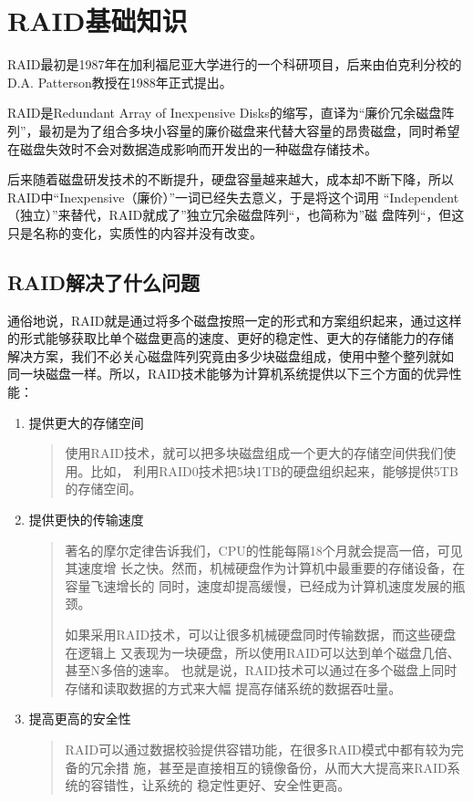 \section{RAID基础知识}

RAID最初是1987年在加利福尼亚大学进行的一个科研项目，后来由伯克利分校的
D.A. Patterson教授在1988年正式提出。

RAID是Redundant Array of Inexpensive Disks的缩写，直译为“廉价冗余磁盘阵
列”，最初是为了组合多块小容量的廉价磁盘来代替大容量的昂贵磁盘，同时希望
在磁盘失效时不会对数据造成影响而开发出的一种磁盘存储技术。

后来随着磁盘研发技术的不断提升，硬盘容量越来越大，成本却不断下降，所以
RAID中“Inexpensive（廉价）”一词已经失去意义，于是将这个词用
“Independent（独立）”来替代，RAID就成了”独立冗余磁盘阵列“，也简称为”磁
盘阵列“，但这只是名称的变化，实质性的内容并没有改变。

\subsection{RAID解决了什么问题}

通俗地说，RAID就是通过将多个磁盘按照一定的形式和方案组织起来，通过这样
的形式能够获取比单个磁盘更高的速度、更好的稳定性、更大的存储能力的存储
解决方案，我们不必关心磁盘阵列究竟由多少块磁盘组成，使用中整个整列就如
同一块磁盘一样。所以，RAID技术能够为计算机系统提供以下三个方面的优异性
能：

\begin{enumerate}[itemsep=0pt,parsep=0pt]
\item 提供更大的存储空间
\begin{quote}
  使用RAID技术，就可以把多块磁盘组成一个更大的存储空间供我们使用。比如，
  利用RAID0技术把5块1TB的硬盘组织起来，能够提供5TB的存储空间。
\end{quote}

\item 提供更快的传输速度
\begin{quote}
  著名的摩尔定律告诉我们，CPU的性能每隔18个月就会提高一倍，可见其速度增
  长之快。然而，机械硬盘作为计算机中最重要的存储设备，在容量飞速增长的
  同时，速度却提高缓慢，已经成为计算机速度发展的瓶颈。

  如果采用RAID技术，可以让很多机械硬盘同时传输数据，而这些硬盘在逻辑上
  又表现为一块硬盘，所以使用RAID可以达到单个磁盘几倍、甚至N多倍的速率。
  也就是说，RAID技术可以通过在多个磁盘上同时存储和读取数据的方式来大幅
  提高存储系统的数据吞吐量。
\end{quote}

\item 提高更高的安全性
\begin{quote}
RAID可以通过数据校验提供容错功能，在很多RAID模式中都有较为完备的冗余措
施，甚至是直接相互的镜像备份，从而大大提高来RAID系统的容错性，让系统的
稳定性更好、安全性更高。
\end{quote}
\end{enumerate}

